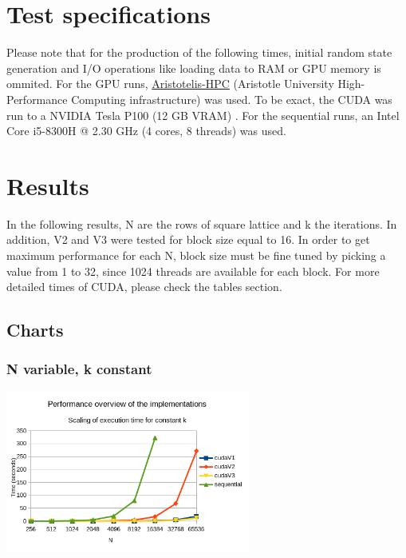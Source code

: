 \documentclass[11pt]{article}
\begin{document}
\section{Test specifications}
\label{sec:orgaacf3d7}
Please note that for the production of the following times, initial random state generation and I/O operations like loading data to RAM or GPU memory is ommited. For the GPU runs, \href{https://hpc.it.auth.gr/}{Aristotelis-HPC} (Aristotle University High-Performance Computing infrastructure) was used. To be exact, the CUDA was run to a NVIDIA Tesla P100 (12 GB VRAM) \autocite{hpc-resources}. For the sequential runs, an Intel Core i5-8300H @ 2.30 GHz (4 cores, 8 threads) was used.
\section{Results}
\label{sec:org8d4d9ee}
In the following results, N are the rows of square lattice and k the iterations. In addition, V2 and V3 were tested for block size equal to 16. In order to get maximum performance for each N, block size must be fine tuned by picking a value from 1 to 32, since 1024 threads are available for each block. For more detailed times of CUDA, please check the tables section.
\pagebreak
\subsection{Charts}
\label{sec:orgc9a3eb2}
\subsubsection{N variable, k constant}
\label{sec:org92640e7}
\begin{center}
\includegraphics[height=200]{./images/performance-overview.png}
\end{center}
\end{document}
